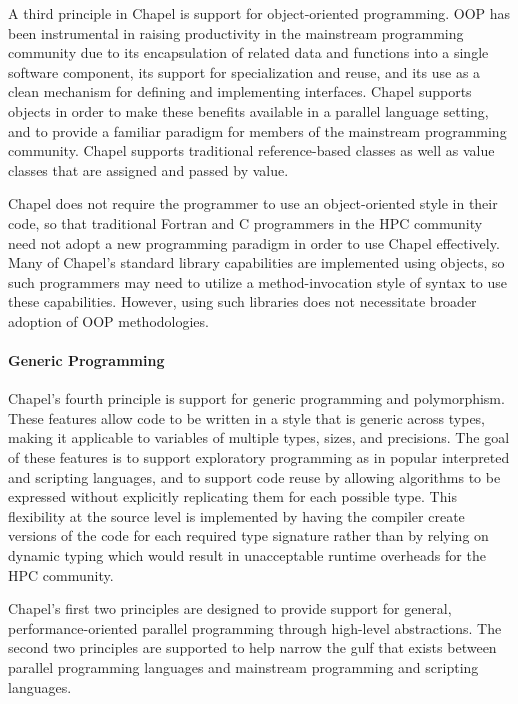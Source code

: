 A third principle in Chapel is support for object-oriented
programming.  OOP has been instrumental in raising productivity in the
mainstream programming community due to its encapsulation of related
data and functions into a single software component, its support for
specialization and reuse, and its use as a clean mechanism for
defining and implementing interfaces.  Chapel supports objects in
order to make these benefits available in a parallel language setting,
and to provide a familiar paradigm for members of the mainstream
programming community.  Chapel supports traditional reference-based
classes as well as value classes that are assigned and passed by
value.

Chapel does not require the programmer to use an object-oriented style
in their code, so that traditional Fortran and C programmers in the
HPC community need not adopt a new programming paradigm in order to
use Chapel effectively.  Many of Chapel's standard library
capabilities are implemented using objects, so such programmers may
need to utilize a method-invocation style of syntax to use these
capabilities.  However, using such libraries does not necessitate
broader adoption of OOP methodologies.

\paragraph{Generic Programming}

Chapel's fourth principle is support for generic programming and
polymorphism.  These features allow code to be written in a style that
is generic across types, making it applicable to variables of multiple
types, sizes, and precisions.  The goal of these features is to
support exploratory programming as in popular interpreted and
scripting languages, and to support code reuse by allowing algorithms
to be expressed without explicitly replicating them for each possible
type.  This flexibility at the source level is implemented by having
the compiler create versions of the code for each required type
signature rather than by relying on dynamic typing which would result
in unacceptable runtime overheads for the HPC community.

Chapel's first two principles are designed to provide support for
general, performance-oriented parallel programming through high-level
abstractions.  The second two principles are supported to help narrow
the gulf that exists between parallel programming languages and
mainstream programming and scripting languages.


